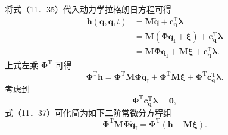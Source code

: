 将式（11．35）代入动力学拉格朗日方程可得
\[
\begin{aligned}
\boldsymbol{h}(\boldsymbol{q}, \dot{\boldsymbol{q}}, t) & =\boldsymbol{M} \ddot{\boldsymbol{q}}+\boldsymbol{c}_{\boldsymbol{q}}^{\mathrm{T}} \boldsymbol{\lambda} \\
& =\boldsymbol{M}\left(\boldsymbol{\Phi} \ddot{\boldsymbol{q}}_{\mathrm{I}}+\boldsymbol{\xi}\right)+\boldsymbol{c}_{\boldsymbol{q}}^{\mathrm{T}} \boldsymbol{\lambda} \\
& =\boldsymbol{M} \boldsymbol{\Phi} \ddot{\boldsymbol{q}}_{\mathrm{I}}+\boldsymbol{M} \boldsymbol{\xi}+\boldsymbol{c}_{\boldsymbol{q}}^{\mathrm{T}} \boldsymbol{\lambda} .
\end{aligned}
\]
上式左乘  $\boldsymbol{\Phi}^{\mathrm{T}}$  可得
\[
\boldsymbol{\Phi}^{\mathrm{T}} \boldsymbol{h}=\boldsymbol{\Phi}^{\mathrm{T}} \boldsymbol{M} \boldsymbol{\Phi} \ddot{\boldsymbol{q}}_{\mathrm{I}}+\boldsymbol{\Phi}^{\mathrm{T}} \boldsymbol{M} \boldsymbol{\xi}+\boldsymbol{\Phi}^{\mathrm{T}} \boldsymbol{c}_{\boldsymbol{q}}^{\mathrm{T}} \boldsymbol{\lambda} .
\]
考虑到
\[
\boldsymbol{\Phi}^{\mathrm{T}} \boldsymbol{c}_{\boldsymbol{q}}^{\mathrm{T}} \boldsymbol{\lambda}=\mathbf{0},
\]
式（11．37）可化简为如下二阶常微分方程组
\[
\boldsymbol{\Phi}^{\mathrm{T}} \boldsymbol{M} \boldsymbol{\Phi} \ddot{\boldsymbol{q}}_{\mathrm{I}}=\boldsymbol{\Phi}^{\mathrm{T}}(\boldsymbol{h}-\boldsymbol{M} \boldsymbol{\xi}) .
\]
